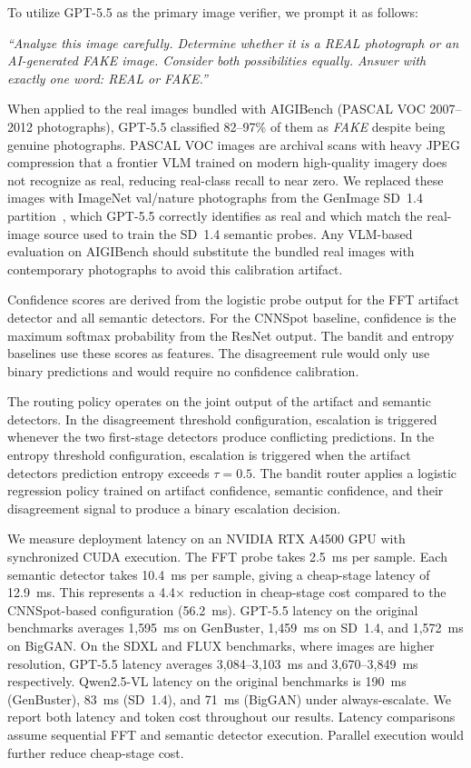 \documentclass{ieeeaccess}
\begin{document}
To utilize GPT-5.5 as the primary image verifier, we prompt it as follows:

\noindent
\begin{minipage}{\linewidth}
\vspace{10pt}
\itshape
``Analyze this image carefully. Determine whether it is a REAL photograph or an AI-generated FAKE image. Consider both possibilities equally. Answer with exactly one word: REAL or FAKE.''
\vspace{10pt}
\end{minipage}

When applied to the real images bundled with AIGIBench (PASCAL VOC 2007--2012
photographs), GPT-5.5 classified 82--97\% of them as \emph{FAKE} despite being
genuine photographs. PASCAL VOC images are archival scans with heavy JPEG
compression that a frontier VLM trained on modern high-quality imagery does not
recognize as real, reducing real-class recall to near zero. We replaced these
images with ImageNet val/nature photographs from the GenImage SD~1.4
partition~\cite{NEURIPS2023_f4d4a021}, which GPT-5.5 correctly identifies as real
and which match the real-image source used to train the SD~1.4 semantic probes.
Any VLM-based evaluation on AIGIBench should substitute the bundled real images
with contemporary photographs to avoid this calibration artifact.


Confidence scores are derived from the logistic probe output for the FFT artifact detector and all semantic detectors. For the CNNSpot baseline, confidence is the maximum softmax probability from the ResNet output. The bandit and entropy baselines use these scores as features. The disagreement rule would only use binary predictions and would require no confidence
calibration.

The routing policy operates on the joint output of the artifact and semantic detectors. 
In the disagreement threshold configuration, escalation is triggered whenever the two first-stage detectors produce conflicting 
predictions. In the entropy threshold configuration, escalation is 
triggered when the artifact detectors prediction entropy exceeds $\tau = 0.5$. The 
bandit router applies a logistic regression policy trained on artifact
confidence, semantic confidence, and their disagreement signal to produce 
a binary escalation decision.

We measure deployment latency on an NVIDIA RTX A4500 GPU with synchronized CUDA execution. The FFT probe takes 2.5~ms per sample. Each semantic detector takes 10.4~ms per sample,
giving a cheap-stage latency of 12.9~ms. This represents a 4.4$\times$ reduction in cheap-stage cost compared to the CNNSpot-based configuration (56.2~ms). GPT-5.5 latency on the original benchmarks averages 1{,}595~ms on GenBuster, 1{,}459~ms on SD~1.4, and 1{,}572~ms on BigGAN. On the SDXL and FLUX benchmarks, where images are higher resolution, GPT-5.5 latency averages 3{,}084--3{,}103~ms and 3{,}670--3{,}849~ms respectively. Qwen2.5-VL
latency on the original benchmarks is 190~ms (GenBuster), 83~ms (SD~1.4), and 71~ms
(BigGAN) under always-escalate. We report both latency and token cost throughout our results. Latency comparisons assume sequential FFT and semantic detector execution. Parallel
execution would further reduce cheap-stage cost.
\end{document}
